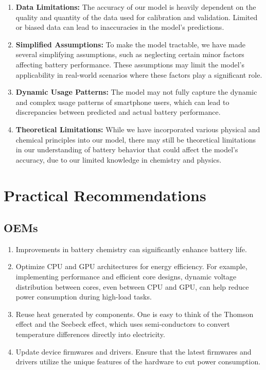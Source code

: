 \documentclass[12pt]{article}
\begin{document}
\begin{enumerate}
	\item \textbf{Data Limitations:} The accuracy of our model is heavily dependent on the quality and quantity of the data used for calibration and validation. Limited or biased data can lead to inaccuracies in the model's predictions.
	\item \textbf{Simplified Assumptions:} To make the model tractable, we have made several simplifying assumptions, such as neglecting certain minor factors affecting battery performance. These assumptions may limit the model's applicability in real-world scenarios where these factors play a significant role.
	\item \textbf{Dynamic Usage Patterns:} The model may not fully capture the dynamic and complex usage patterns of smartphone users, which can lead to discrepancies between predicted and actual battery performance.
	\item \textbf{Theoretical Limitations:} While we have incorporated various physical and chemical principles into our model, there may still be theoretical limitations in our understanding of battery behavior that could affect the model's accuracy, due to our limited knowledge in chemistry and physics.
\end{enumerate}

\section{Practical Recommendations}

\subsection{OEMs}

\begin{enumerate}
	\item Improvements in battery chemistry can significantly enhance battery life. 
	\item Optimize CPU and GPU architectures for energy efficiency. For example, implementing performance and efficient core designs, dynamic voltage distribution between cores, even between CPU and GPU, can help reduce power consumption during high-load tasks.
	\item Reuse heat generated by components. One is easy to think of the Thomson effect and the Seebeck effect, which uses semi-conductors to convert temperature differences directly into electricity. 
	\item Update device firmwares and drivers. Ensure that the latest firmwares and drivers utilize the unique features of the hardware to cut power consumption.
\end{enumerate} 
\end{document}
